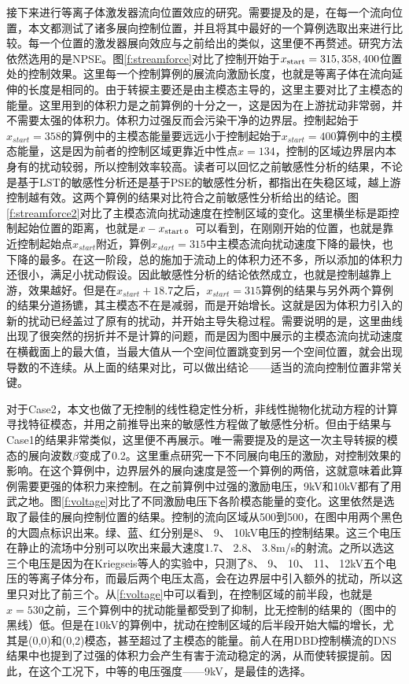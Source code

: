 接下来进行等离子体激发器流向位置效应的研究。需要提及的是，在每一个流向位置，本文都测试了诸多展向控制位置，并且将其中最好的一个算例选取出来进行比较。每一个位置的激发器展向效应与之前给出的类似，这里便不再赘述。研究方法依然选用的是NPSE。图\ref{f:streamforce}对比了控制开始于$x_{\rm start}=315, 358, 400$位置处的控制效果。这里每一个控制算例的展流向激励长度，也就是等离子体在流向延伸的长度是相同的。由于转捩主要还是由主模态主导的，这里主要对比了主模态的能量。这里用到的体积力是之前算例的十分之一，这是因为在上游扰动非常弱，并不需要太强的体积力。体积力过强反而会污染干净的边界层。控制起始于$x_{start}=358$的算例中的主模态能量要远远小于控制起始于$x_{start}=400$算例中的主模态能量，这是因为前者的控制区域更靠近中性点$x=134$，控制的区域边界层内本身有的扰动较弱，所以控制效率较高。读者可以回忆之前敏感性分析的结果，不论是基于LST的敏感性分析还是基于PSE的敏感性分析，都指出在失稳区域，越上游控制越有效。这两个算例的结果对比符合之前敏感性分析给出的结论。图\ref{f:streamforce2}对比了主模态流向扰动速度在控制区域的变化。这里横坐标是距控制起始位置的距离，也就是$x-x_{\rm start}$。可以看到，在刚刚开始的位置，也就是靠近控制起始点$x_{start}$附近，算例$x_{start}=315$中主模态流向扰动速度下降的最快，也下降的最多。在这一阶段，总的施加于流动上的体积力还不多，所以添加的体积力还很小，满足小扰动假设。因此敏感性分析的结论依然成立，也就是控制越靠上游，效果越好。但是在$x_{start}+18.7$之后，$x_{start}=315$算例的结果与另外两个算例的结果分道扬镳，其主模态不在是减弱，而是开始增长。这就是因为体积力引入的新的扰动已经盖过了原有的扰动，并开始主导失稳过程。需要说明的是，这里曲线出现了很突然的拐折并不是计算的问题，而是因为图中展示的主模态流向扰动速度在横截面上的最大值，当最大值从一个空间位置跳变到另一个空间位置，就会出现导数的不连续。从上面的结果对比，可以做出结论——适当的流向控制位置非常关键。

对于Case2，本文也做了无控制的线性稳定性分析，非线性抛物化扰动方程的计算寻找特征模态，并用之前推导出来的敏感性方程做了敏感性分析。但由于结果与Case1的结果非常类似，这里便不再展示。唯一需要提及的是这一次主导转捩的模态的展向波数$\beta$变成了0.2。这里重点研究一下不同展向电压的激励，对控制效果的影响。在这个算例中，边界层外的展向速度是签一个算例的两倍，这就意味着此算例需要更强的体积力来控制。在之前算例中过强的激励电压，9kV和10kV都有了用武之地。图\ref{f:voltage}对比了不同激励电压下各阶模态能量的变化。这里依然是选取了最佳的展向控制位置的结果。控制的流向区域从500到500，在图中用两个黑色的大圆点标识出来。绿、蓝、红分别是8、 9、 10kV电压的控制结果。这三个电压在静止的流场中分别可以吹出来最大速度1.7、 2.8、 3.8m/s的射流。之所以选这三个电压是因为在Kriegseis等人\cite{kriegseis2013velocity}的实验中，只测了8、 9、 10、 11、 12kV五个电压的等离子体分布，而最后两个电压太高，会在边界层中引入额外的扰动，所以这里只对比了前三个。从\ref{f:voltage}中可以看到，在控制区域的前半段，也就是$x = 530$之前，三个算例中的扰动能量都受到了抑制，比无控制的结果的（图中的黑线）低。但是在10kV的算例中，扰动在控制区域的后半段开始大幅的增长，尤其是(0,0)和(0,2)模态，甚至超过了主模态的能量。前人在用DBD控制横流的DNS结果\cite{dorr2016}中也提到了过强的体积力会产生有害于流动稳定的涡，从而使转捩提前。因此，在这个工况下，中等的电压强度——9kV，是最佳的选择。

